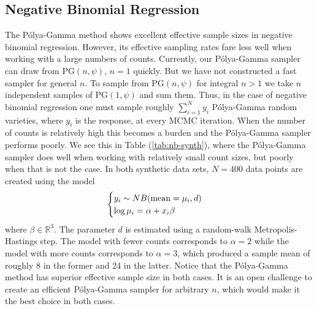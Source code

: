 \documentclass[11pt]{article}
\newcommand{\Polya}{P\'{o}lya}
\newcommand{\PG}{\text{PG}}
\begin{document}
\subsection{Negative Binomial Regression}

The \Polya-Gamma method shows excellent effective sample sizes in negative
binomial regression.  However, its effective sampling rates fare less well when
working with a large numbers of counts.  Currently, our \Polya-Gamma sampler can
draw from $\PG(n, \psi)$, $n=1$ quickly.  But we have not constructed a fast
sampler for general $n$.  To sample from $\PG(n, \psi)$ for integral $n > 1$ we
take $n$ independent samples of $\PG(1, \psi)$ and sum them.  Thus, in the case
of negative binomial regression one must sample roughly $\sum_{i=1}^N y_i$
\Polya-Gamma random varieties, where $y_i$ is the response, at every MCMC
iteration.  When the number of counts is relatively high this becomes a burden
and the \Polya-Gamma sampler performs poorly.  We see this in Table
(\ref{tab:nb-synth}), where the \Polya-Gamma sampler does well when working with
relatively small count sizes, but poorly when that is not the case.  In both
synthetic data sets, $N=400$ data points are created using the model
\[
\begin{cases}
y_i \sim NB(\textmd{mean}=\mu_i, d) \\
\log \mu_i = \alpha + x_i \beta
\end{cases}
\]
where $\beta \in \mathbb{R}^3$.  The parameter $d$ is estimated using a
random-walk Metropolis-Hastings step.  The model with fewer counts corresponds
to $\alpha = 2$ while the model with more counts corresponds to $\alpha = 3$,
which produced a sample mean of roughly 8 in the former and 24 in the latter.
Notice that the \Polya-Gamma method has superior effective sample size in both
cases.  It is an open challenge to create an efficient \Polya-Gamma sampler for
arbitrary $n$, which would make it the best choice in both cases.
\end{document}
